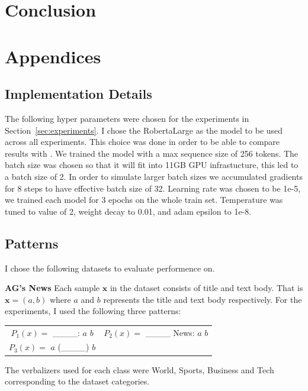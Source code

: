 \documentclass[11pt,a4paper]{article}
\begin{document}
\section{Conclusion}





\newpage
\appendix


\section{Appendices}
\label{sec:appendix}

\subsection{Implementation Details}
\label{apx:implementation-details}
The following hyper parameters were chosen for the experiments in Section~\ref{sec:experiments}.
I chose the RobertaLarge as the model to be used across all experiments.
This choice was done in order to be able to compare results with \citet{schick2020exploiting}.
We trained the model with a max sequence size of 256 tokens.
The batch size was chosen so that it will fit into 11GB GPU infrastucture, this led to a batch size of 2. 
In order to simulate larger batch sizes we accumulated gradients for 8 steps to have effective batch size of 32.
Learning rate was chosen to be 1e-5, we trained each model for 3 epochs on the whole train set.
Temperature was tuned to value of 2, weight decay to 0.01, and adam epsilon to 1e-8.

\subsection{Patterns}
\label{apx:patterns}
I chose the following datasets to evaluate performence on.

\vspace{8pt}
\noindent \textbf{AG's News} \quad
Each sample $\textbf{x}$ in the dataset consists of title and text body.
That is $\textbf{x}=(a, b)$ where $a$ and $b$ represents the title and text body respectively.
For the experiments, I used the following three patterns:
\begin{table}[H]
	\renewcommand{\arraystretch}{1.5}
	\begin{tabularx}{\textwidth}{cc}
		 $P_1(x)=$ \_\_\_\_: $a$ $b$ & $P_2(x)=$ \_\_\_\_ News: $a$ $b$ \\
		 $P_3(x)=$ $a$ (\_\_\_\_) $b$ &  \\
	\end{tabularx}
\end{table}
The verbalizers used for each class were World, Sports, Business and Tech corresponding to the dataset categories.
\end{document}
